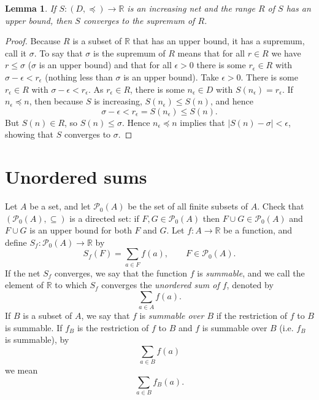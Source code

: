 \documentclass{article}
\newtheorem{lemma}[theorem]{Lemma}
\begin{document}
\begin{lemma}
If $S:(D,\preceq) \to \mathbb{R}$ is an increasing net and the range $R$ of $S$ has an upper bound, then $S$ converges to the supremum  of $R$.
\label{monotone}
\end{lemma}
\begin{proof}
Because $R$ is a subset of $\mathbb{R}$ that has an upper bound, it has a supremum, call it $\sigma$. To say that $\sigma$ is the supremum of $R$ means that
for all $r \in R$ we have $r \leq \sigma$ ($\sigma$ is an upper bound) and that for all $\epsilon>0$ there is some $r_\epsilon \in R$ with $\sigma-\epsilon<r_\epsilon$ (nothing less than 
$\sigma$ is an upper bound).
Take $\epsilon>0$. There is some $r_\epsilon \in R$ with $\sigma-\epsilon<r_\epsilon$.  As $r_\epsilon \in R$,
there is some $n_\epsilon \in D$ with $S(n_\epsilon) = r_\epsilon$. If $n_\epsilon \preceq n$, then because $S$ is increasing,
$S(n_\epsilon) \leq S(n)$, and hence
\[
\sigma-\epsilon < r_\epsilon = S(n_\epsilon) \leq S(n).
\]
But $S(n) \in R$, so $S(n) \leq \sigma$. Hence $n_\epsilon \preceq n$ implies that $|S(n)-\sigma|<\epsilon$, showing that $S$
converges to $\sigma$.
\end{proof}


\section{Unordered sums}
Let $A$ be a set, and let $\mathscr{P}_0(A)$ be the set of all finite subsets of $A$. 
Check that $(\mathscr{P}_0(A),\subseteq)$ is a directed set:
if $F,G \in \mathscr{P}_0(A)$  then
$F \cup G \in \mathscr{P}_0(A)$ and $F \cup G$ is an upper bound for both $F$ and $G$. Let $f:A \to \mathbb{R}$ be a function, and define $S_f:\mathscr{P}_0(A) \to \mathbb{R}$ by
\[
S_f(F) =\sum_{a \in F} f(a), \qquad F \in \mathscr{P}_0(A).
\]
If the net $S_f$ converges, we say that the function $f$ is {\em summable}, and we call the element of $\mathbb{R}$ to which $S_f$ converges the {\em unordered sum of $f$},
denoted by
\[
\sum_{a \in A} f(a).
\]
If $B$ is a subset of $A$, we say that $f$ is {\em summable over $B$} if the restriction of $f$ to $B$ is summable. If $f_B$ is the restriction of $f$ to $B$
and $f$ is summable over $B$ (i.e. $f_B$ is summable), by 
\[
\sum_{a \in B} f(a) 
\]
we mean
\[
\sum_{a \in B} f_B(a).
\]
\end{document}

